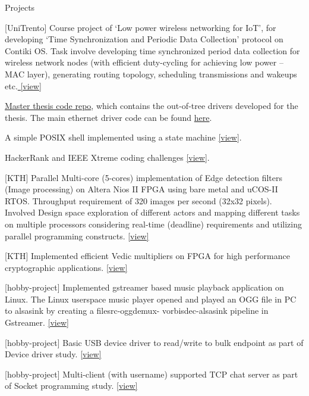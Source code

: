 \documentclass[
	a4paper, %
	11pt, %
]{resume} %
\begin{document}

\begin{rSection}{Projects}

        \item {[UniTrento]} Course project of ‘Low power wireless networking for IoT’, for developing ‘Time Synchronization and Periodic Data Collection’ protocol on Contiki OS. Task involve developing time synchronized period data collection for wireless network nodes (with efficient duty-cycling for achieving low power – MAC layer), generating routing topology, scheduling transmissions and wakeups etc.\href{https://github.com/sebinsphilip/LowPowerWN\_IOT}{ [view]}
        \item {} \href{https://github.com/sebinsphilip/zephyr\_xmc}{Master thesis code repo}, which contains the out-of-tree drivers developed for the thesis. The main ethernet driver code can be found \href{https://github.com/sebinsphilip/zephyr\_xmc/tree/main/drivers/zephyr/ethernet}{here}.
        \item {} A simple POSIX shell implemented using a state machine \href{https://github.com/sebinsphilip/matician\_shell}{[view]}.
        \item {} HackerRank and IEEE Xtreme coding challenges \href{https://github.com/sebinsphilip/coding\_challenge}{[view]}.
        \item {[KTH]} Parallel Multi-core (5-cores) implementation of Edge detection filters (Image processing) on Altera Nios II FPGA using bare metal and uCOS-II RTOS. Throughput requirement of 320 images per second (32x32 pixels). Involved Design space exploration of different actors and mapping different tasks on multiple processors considering real-time (deadline) requirements and utilizing parallel programming constructs. \href{https://github.com/sebinsphilip/Embedded\_software\_lab} {[view]}
        \item {[KTH]} Implemented efficient Vedic multipliers on FPGA for high performance cryptographic applications. \href{https://github.com/sebinsphilip/vedic\_multiplier\_kth\_writing\_course}{[view]}
        \item {[hobby-project]} Implemented gstreamer based music playback application on Linux. The Linux userspace music player opened and played an OGG file in PC to alsasink by creating a filesrc-oggdemux- vorbisdec-alsasink pipeline in Gstreamer.
        \href{https://github.com/sebinsphilip/gstreamer\_applications}{[view]}
        \item {[hobby-project]} Basic USB device driver to read/write to bulk endpoint as part of Device driver study. \href{https://github.com/sebinsphilip/device\_drivers}{[view]}
        \item {[hobby-project]} Multi-client (with username) supported TCP chat server as part of Socket programming study. \href{https://github.com/sebinsphilip/sockets}{[view]}

\end{rSection}
\end{document}
